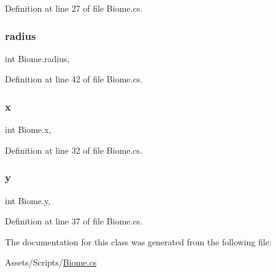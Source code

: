 Definition at line 27 of file Biome.\+cs.

\mbox{\label{class_biome_a71b951bc82d85f930f9c6135a79a2bbc}} 
\subsubsection{\texorpdfstring{radius}{radius}}
{\footnotesize\ttfamily int Biome.\+radius\hspace{0.3cm}{\ttfamily [get]}, {\ttfamily [set]}}



Definition at line 42 of file Biome.\+cs.

\mbox{\label{class_biome_ae63d1400ef2eaa0c520bec593aa2e90d}} 
\subsubsection{\texorpdfstring{x}{x}}
{\footnotesize\ttfamily int Biome.\+x\hspace{0.3cm}{\ttfamily [get]}, {\ttfamily [set]}}



Definition at line 32 of file Biome.\+cs.

\mbox{\label{class_biome_a3793ddae113d9c2b545a2dc7c6b96f3a}} 
\subsubsection{\texorpdfstring{y}{y}}
{\footnotesize\ttfamily int Biome.\+y\hspace{0.3cm}{\ttfamily [get]}, {\ttfamily [set]}}



Definition at line 37 of file Biome.\+cs.



The documentation for this class was generated from the following file\+:\begin{DoxyCompactItemize}
\item 
Assets/\+Scripts/\mbox{\hyperlink{_biome_8cs}{Biome.\+cs}}\end{DoxyCompactItemize}
